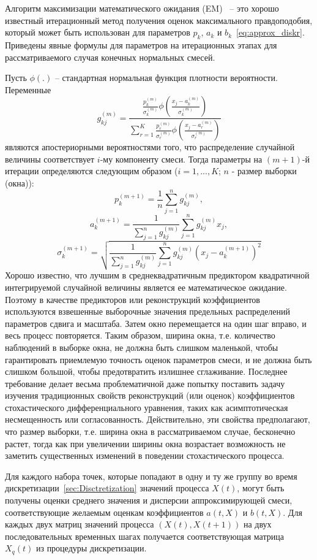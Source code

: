 Алгоритм максимизации математического ожидания (EM)~\cite{McLachlan2007} -- это хорошо известный итерационный метод получения оценок максимального правдоподобия, который может быть использован для параметров $p_k$, $a_k$ и $b_k$~\eqref{eq:approx_diskr}. Приведены явные формулы для параметров на итерационных этапах для рассматриваемого случая конечных нормальных смесей. 

Пусть $\phi(.)$ -- стандартная нормальная функция плотности вероятности. Переменные 
$$
g_{kj}^{(m)}= \frac{\frac{p_k^{(m)}}{\sigma_k^{(m)}} \phi\left(\frac{x_j - a_k^{(m)}}{\sigma_k^{(m)}} \right)}{\sum\limits_{r=1}^K \frac{p_r^{(m)}}{\sigma_r^{(m)}} \phi\left(\frac{x_j - a_r^{(m)}}{\sigma_r^{(m)}} \right)}
$$
являются апостериорными вероятностями того, что распределение случайной величины соответствует $i$-му компоненту смеси. Тогда параметры на $(m+1)$-й итерации определяются следующим образом ($i=1,...,K$; $n$ - размер выборки (окна)):
$$
p_k^{(m+1)} = \frac{1}{n} \sum\limits_{j=1}^n g_{kj}^{(m)},
$$
$$
a_k^{(m+1)} = \frac{1}{\sum\limits_{j=1}^n g_{kj}^{(m)}} \sum\limits_{j=1}^n g_{kj}^{(m)} x_j,
$$
$$
\sigma_k^{(m+1)} = \sqrt{\frac{1}{\sum\limits_{j=1}^n g_{kj}^{(m)}} \sum\limits_{j=1}^n g_{kj}^{(m)} (x_j - a_k^{(m+1)})^2}
$$
Хорошо известно, что лучшим в среднеквадратичным предиктором квадратичной интегрируемой случайной величины является ее математическое ожидание. Поэтому в качестве предикторов или реконструкций коэффициентов используются взвешенные выборочные значения предельных распределений параметров сдвига и масштаба. Затем окно перемещается на один шаг вправо, и весь процесс повторяется. Таким образом, ширина окна, т.е. количество наблюдений в выборке окна, не должна быть слишком маленькой, чтобы гарантировать приемлемую точность оценок параметров смеси, и не должна быть слишком большой, чтобы предотвратить излишнее сглаживание. Последнее требование делает весьма проблематичной даже попытку поставить задачу изучения традиционных свойств реконструкций (или оценок) коэффициентов стохастического дифференциального уравнения, таких как асимптотическая несмещенность или согласованность. Действительно, эти свойства предполагают, что размер выборки, т.е. ширина окна в рассматриваемом случае, бесконечно растет, тогда как при увеличении ширины окна возрастает возможность не заметить существенных изменений в поведении стохастического процесса.

Для каждого набора точек, которые попадают в одну и ту же группу во время дискретизации~\ref{sec:Disctretization} значений процесса $X(t)$, могут быть получены оценки среднего значения и дисперсии аппроксимирующей смеси, соответствующие желаемым оценкам коэффициентов $a(t,X)$ и $b(t,X)$. Для каждых двух матриц значений процесса $(X(t),X(t+1))$ на двух последовательных временных шагах получается соответствующая матрица $X_q(t)$ из процедуры дискретизации.



